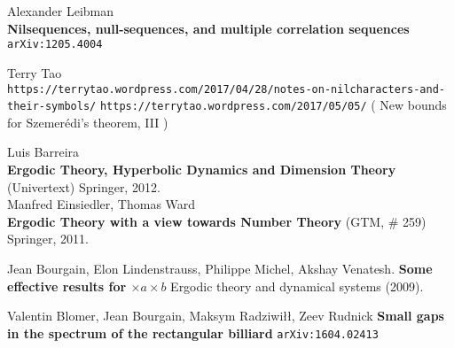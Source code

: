 \documentclass[12pt]{article}
\begin{document}
\begin{thebibliography}{}

\item Alexander Leibman \\ \textbf{Nilsequences, null-sequences, and multiple correlation sequences} \texttt{ arXiv:1205.4004} 
\item 
Terry Tao \\
\texttt{https://terrytao.wordpress.com/2017/04/28/notes-on-nilcharacters-and-their-symbols/}
\texttt{https://terrytao.wordpress.com/2017/05/05/} ( New bounds for Szemer\'{e}di's theorem, III )

\item Luis Barreira \\ \textbf{Ergodic Theory, Hyperbolic
Dynamics and Dimension
Theory} (Univertext) Springer, 2012. \\ 
Manfred Einsiedler, Thomas Ward \\ \textbf{Ergodic Theory
with a view towards Number Theory} (GTM, \# 259) Springer, 2011.

\item Jean Bourgain, Elon Lindenstrauss, Philippe Michel, Akshay Venatesh. \textbf{Some effective results for $\times a \times b$} Ergodic theory and dynamical systems (2009).

\item Valentin Blomer, Jean Bourgain, Maksym Radziwi\l\l, Zeev Rudnick \textbf{Small gaps in the spectrum of the rectangular billiard} \texttt{arXiv:1604.02413}

\end{thebibliography}


\newpage
\end{document}
